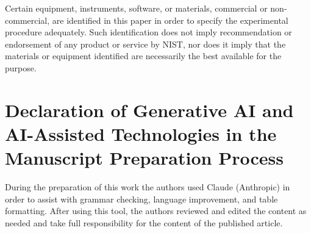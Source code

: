 \documentclass[a4paper,fleqn]{cas-sc}   %
\begin{document}
Certain equipment, instruments, software, or materials, commercial or non-commercial, are identified in this paper in order to specify the experimental procedure adequately. Such identification does not imply recommendation or endorsement of any product or service by NIST, nor does it imply that the materials or equipment identified are necessarily the best available for the purpose.

\section*{Declaration of Generative AI and AI-Assisted Technologies in the Manuscript Preparation Process}

During the preparation of this work the authors used Claude (Anthropic) in order to assist with grammar checking, language improvement, and table formatting. After using this tool, the authors reviewed and edited the content as needed and take full responsibility for the content of the published article.

\printbibliography
\end{document}
